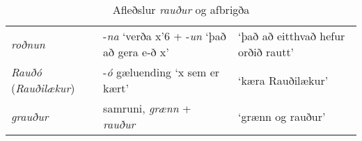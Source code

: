 \documentclass[../samsetningasafn.tex]{subfiles}
\begin{document}
\begin{table}[ht!]
\begin{footnotesize}
\begin{tcolorbox}
\begin{center}
\begin{tabularx}{\textwidth}{Xll}
	\textit{roðnun}		&	-\textit{na} \lq verða x\rq6{} + -\textit{un} \lq það að gera e-ð x\rq{}	&	\lq það að eitthvað hefur orðið rautt\rq	\\
	\textit{Rauðó} (\textit{Rauðilækur})	&	-\textit{ó} gæluending \lq x sem er kært\rq	&	\lq kæra Rauðilækur\rq \\
	\textit{grauður}		&	samruni, \textit{grænn} + \textit{rauður}	&	\lq grænn og rauður\rq	\\
	\end{tabularx}
	\end{center}
\end{tcolorbox}
\end{footnotesize}
	\caption{Afleðslur \textit{rauður} og afbrigða}
	\label{tafla:rafl}
\end{table}

\clearpage
\end{document}
